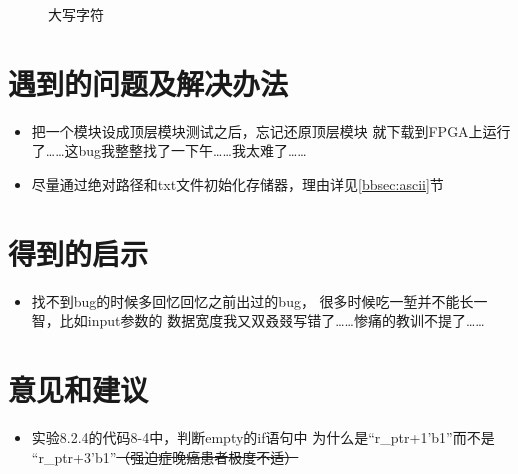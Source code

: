 \documentclass[12pt,a4paper,UTF8]{article}
\begin{document}
\begin{figure}[H]
  \centering
  \caption{大写字符}
  \label{fpga_uppercase}
\end{figure}

\section{遇到的问题及解决办法}
\begin{itemize}
  \item 把一个模块设成顶层模块测试之后，忘记还原顶层模块
        就下载到FPGA上运行了……这bug我整整找了一下午……我太难了……
  \item 尽量通过绝对路径和txt文件初始化存储器，理由详见\ref*{bbsec:ascii}节
\end{itemize}

\section{得到的启示}
\begin{itemize}
  \item 找不到bug的时候多回忆回忆之前出过的bug，
        很多时候吃一堑并不能长一智，比如input参数的
        数据宽度我又双叒叕写错了……惨痛的教训不提了……
\end{itemize}

\section{意见和建议}
\begin{itemize}
  \item 实验8.2.4的代码8-4中，判断empty的if语句中
        为什么是``\mbox{r\_ptr+1'b1}''而不是
        ``\mbox{r\_ptr+3'b1}''\sout{（强迫症晚癌患者极度不适）}
\end{itemize}
\end{document}

